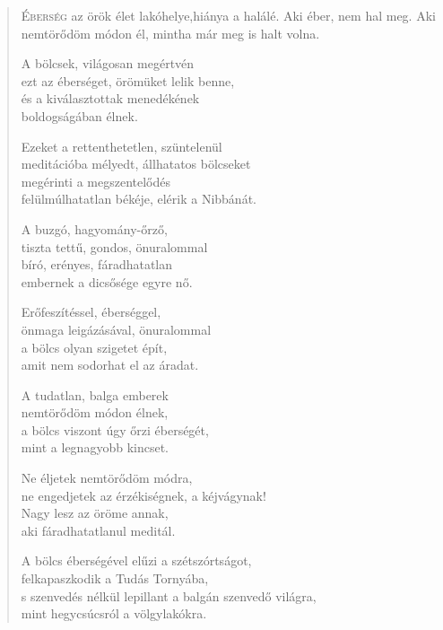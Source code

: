 
\vspace*{-\baselineskip}
\begin{verse}

{\par%
\lettrine{É}{berség} {\LettrineTextFont az örök élet lakóhelye,}\newline hiánya a halálé.\newline
Aki éber, nem hal meg.\verselinebreak
Aki nemtörődöm módon él,\verselinebreak
mintha már meg is halt volna.
\par}

 A bölcsek, világosan megértvén\\
ezt az éberséget, örömüket lelik benne,\\
és a kiválasztottak menedékének\\
boldogságában élnek.

 Ezeket a rettenthetetlen, szüntelenül\\
meditációba mélyedt, állhatatos bölcseket\\
megérinti a megszentelődés\\
felülmúlhatatlan békéje, elérik a Nibbánát.

 A buzgó, hagyomány-őrző,\\
tiszta tettű, gondos, önuralommal\\
bíró, erényes, fáradhatatlan\\
embernek a dicsősége egyre nő.

 Erőfeszítéssel, éberséggel,\\
önmaga leigázásával, önuralommal\\
a bölcs olyan szigetet épít,\\
amit nem sodorhat el az áradat.

 A tudatlan, balga emberek\\
nemtörődöm módon élnek,\\
a bölcs viszont úgy őrzi éberségét,\\
mint a legnagyobb kincset.

 Ne éljetek nemtörődöm módra,\\
ne engedjetek az érzékiségnek, a kéjvágynak!\\
Nagy lesz az öröme annak,\\
aki fáradhatatlanul meditál.

 A bölcs éberségével elűzi a szétszórtságot,\\
felkapaszkodik a Tudás Tornyába,\\
s szenvedés nélkül lepillant a balgán szenvedő világra,\\
mint hegycsúcsról a völgylakókra.


\end{verse}
